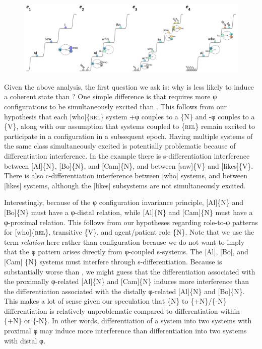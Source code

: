   
\begin{figure}
\includegraphics[width=\textwidth]{figures/Tilsen-img132.png}
\caption{\missingcaption}
\label{fig:}
\end{figure}
 

  Given the above analysis, the first question we ask is: why is  less likely to induce a coherent state than ? One simple difference is that  requires more φ configurations to be simultaneously excited than . This follows from our hypothesis that each [who]\{\textsc{rel}\} system +φ couples to a \{N\} and -φ couples to a \{V\}, along with our assumption that systems coupled to \{\textsc{rel}\} remain excited to participate in a configuration in a subsequent epoch. Having multiple systems of the same class simultaneously excited is potentially problematic because of differentiation interference. In the example there is s-differentiation interference between [Al]\{N\}, [Bo]\{N\}, and [Cam]\{N\}, and between [saw]\{V\} and [likes]\{V\}. There is also c-differentiation interference between [who] systems, and between [likes] systems, although the [likes] subsystems are not simultaneously excited. 

  Interestingly, because of the φ configuration invariance principle, [Al]\{N\} and [Bo]\{N\} must have a φ-distal relation, while [Al]\{N\} and [Cam]\{N\} must have a φ-proximal relation. This follows from our hypotheses regarding role-to-φ patterns for [who]\{\textsc{rel}\}, transitive \{V\}, and agent/patient role \{N\}. Note that we use the term \textit{relation} here rather than configuration because we do not want to imply that the φ pattern arises directly from φ-coupled s-systems. The [Al], [Bo], and [Cam] \{N\} systems must interfere through s-differentiation. Because  is substantially worse than , we might guess that the differentiation associated with the proximally φ-related [Al]\{N\} and [Cam]\{N\} induces more interference than the differentiation associated with the distally φ-related [Al]\{N\} and [Bo]\{N\}. This makes a lot of sense given our speculation that \{N\} to \{+N\}/\{-N\} differentiation is relatively unproblematic compared to differentiation within \{+N\} or \{-N\}. In other words, differentiation of a system into two systems with proximal φ may induce more interference than differentiation into two systems with distal φ.

